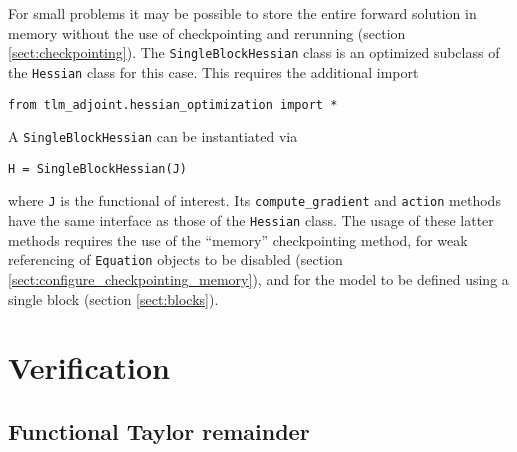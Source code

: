\documentclass[11pt]{article}
\begin{document}
For small problems it may be possible to store the entire forward solution in
memory without the use of checkpointing and rerunning (section
\ref{sect:checkpointing}). The \texttt{SingleBlockHessian} class is an
optimized subclass of the \texttt{Hessian} class for this case. This requires
the additional import
\begin{lstlisting}
from tlm_adjoint.hessian_optimization import *
\end{lstlisting}

A \texttt{SingleBlockHessian} can be instantiated via
\begin{lstlisting}
H = SingleBlockHessian(J)
\end{lstlisting}
where \texttt{J} is the functional of interest. Its \texttt{compute\_gradient}
and \texttt{action} methods have the same interface as those of the
\texttt{Hessian} class. The usage of these latter methods requires the use of
the ``memory'' checkpointing method, for weak referencing of \texttt{Equation}
objects to be disabled (section \ref{sect:configure_checkpointing_memory}), and
for the model to be defined using a single block (section \ref{sect:blocks}).

\section{Verification}\label{sect:verification}

\subsection{Functional Taylor remainder}
\end{document}
